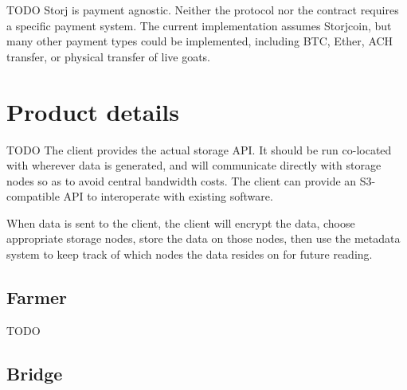 \documentclass[a4paper,10pt]{article}
\newcommand{\todo}[1]{{\color{red} TODO #1}}
\begin{document}
\todo{
Storj is payment agnostic. Neither the protocol nor the contract requires a
specific payment system. The current implementation assumes Storjcoin, but many
other payment types could be implemented, including BTC, Ether, ACH transfer, or
physical transfer of live goats.
}

\section{Product details}

\todo{
The client provides the actual storage API. It should be run co-located with
wherever data is generated, and will communicate directly with storage nodes
so as to avoid central bandwidth costs. The client can provide an S3-compatible
API to interoperate with existing software.

When data is sent to the client, the client will encrypt the data, choose
appropriate storage nodes, store the data on those nodes, then use the metadata
system to keep track of which nodes the data resides on for future reading.
}

\subsection{Farmer}

\todo{}

\subsection{Bridge}
\end{document}
